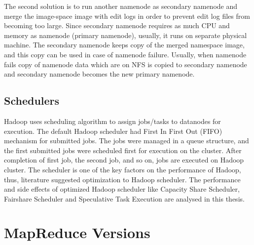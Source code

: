  The second solution is to run another namenode as secondary namenode and merge the image-space image with edit logs in order to prevent edit log files from becoming too large. Since secondary namenode requires as much CPU and memory as namenode (primary namenode), usually, it runs on separate physical machine. The secondary namenode keeps copy of the merged namespace image, and this copy can be used in case of namenode failure. Usually, when namenode fails copy of namenode data which are on NFS is copied to secondary namenode and secondary namenode becomes the new primary namenode.


   




\subsection{Schedulers}

Hadoop uses scheduling algorithm to assign jobs/tasks to datanodes for execution. The default Hadoop scheduler had First In First Out (FIFO) mechanism for submitted jobs. The jobs were managed in a queue structure,  and the first submitted jobs were scheduled first for execution on the cluster. After completion of first job, the second job, and so on, jobs are executed on Hadoop cluster. The scheduler is one of the key factors on the performance of Hadoop, thus, literature suggested optimization to Hadoop scheduler. The performance and side effects of optimized Hadoop scheduler like Capacity Share Scheduler, Fairshare Scheduler and Speculative Task Execution are analysed in this thesis.  



 





\section{MapReduce Versions}

